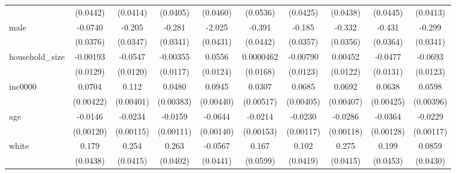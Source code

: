 {\begin{tabular}{l*{9}{c}}
            &    (0.0442)         &    (0.0414)         &    (0.0405)         &    (0.0460)         &    (0.0536)         &    (0.0425)         &    (0.0438)         &    (0.0445)         &    (0.0413)         \\
[1em]
male        &     -0.0740\sym{**} &      -0.205\sym{***}&      -0.281\sym{***}&      -2.025\sym{***}&      -0.391\sym{***}&      -0.185\sym{***}&      -0.332\sym{***}&      -0.431\sym{***}&      -0.299\sym{***}\\
            &    (0.0376)         &    (0.0347)         &    (0.0341)         &    (0.0431)         &    (0.0442)         &    (0.0357)         &    (0.0356)         &    (0.0364)         &    (0.0341)         \\
[1em]
household\_size&    -0.00193         &     -0.0547\sym{***}&    -0.00355         &      0.0556\sym{***}&   0.0000462         &    -0.00790         &     0.00452         &     -0.0477\sym{***}&     -0.0693\sym{***}\\
            &    (0.0129)         &    (0.0120)         &    (0.0117)         &    (0.0124)         &    (0.0168)         &    (0.0123)         &    (0.0122)         &    (0.0131)         &    (0.0123)         \\
[1em]
inc0000     &      0.0704\sym{***}&       0.112\sym{***}&      0.0480\sym{***}&      0.0945\sym{***}&      0.0307\sym{***}&      0.0685\sym{***}&      0.0692\sym{***}&      0.0638\sym{***}&      0.0598\sym{***}\\
            &   (0.00422)         &   (0.00401)         &   (0.00383)         &   (0.00440)         &   (0.00517)         &   (0.00405)         &   (0.00407)         &   (0.00425)         &   (0.00396)         \\
[1em]
age         &     -0.0146\sym{***}&     -0.0234\sym{***}&     -0.0159\sym{***}&     -0.0644\sym{***}&     -0.0214\sym{***}&     -0.0230\sym{***}&     -0.0286\sym{***}&     -0.0364\sym{***}&     -0.0229\sym{***}\\
            &   (0.00120)         &   (0.00115)         &   (0.00111)         &   (0.00140)         &   (0.00153)         &   (0.00117)         &   (0.00118)         &   (0.00128)         &   (0.00117)         \\
[1em]
white       &       0.179\sym{***}&       0.254\sym{***}&       0.263\sym{***}&     -0.0567         &       0.167\sym{***}&       0.102\sym{**} &       0.275\sym{***}&       0.199\sym{***}&      0.0859\sym{**} \\
            &    (0.0438)         &    (0.0415)         &    (0.0402)         &    (0.0441)         &    (0.0599)         &    (0.0419)         &    (0.0415)         &    (0.0453)         &    (0.0430)         \\

\end{tabular}}
